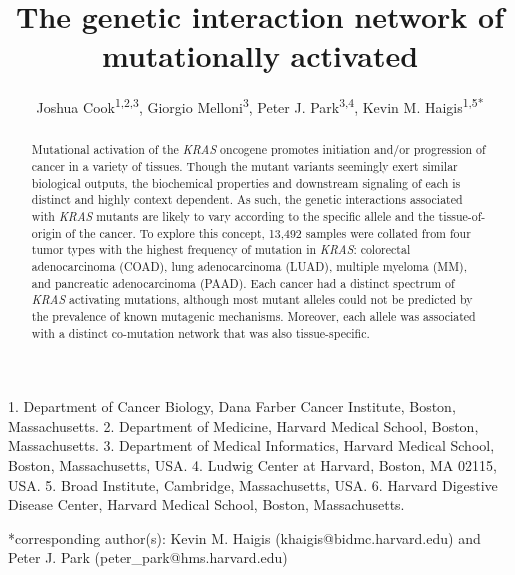 \documentclass[english, 12pt, letterpaper]{article}
\title{The genetic interaction network of mutationally activated \KRAS{}}
\author{
    Joshua Cook\textsuperscript{1,2,3},
    Giorgio Melloni\textsuperscript{3}, 
    Peter J. Park\textsuperscript{3,4}, 
    Kevin M. Haigis\textsuperscript{1,5{*}}
}
\newcommand{\KRAS}{\emph{KRAS}}
\begin{document}
\maketitle

\thispagestyle{fancy}

1. Department of Cancer Biology, Dana Farber Cancer Institute, Boston, Massachusetts.
2. Department of Medicine, Harvard Medical School, Boston, Massachusetts.
3. Department of Medical Informatics, Harvard Medical School, Boston, Massachusetts, USA.
4. Ludwig Center at Harvard, Boston, MA 02115, USA.
5. Broad Institute, Cambridge, Massachusetts, USA.
6. Harvard Digestive Disease Center, Harvard Medical School, Boston, Massachusetts.

{*}corresponding author(s):
Kevin M. Haigis (khaigis@bidmc.harvard.edu) and Peter J. Park (peter\_park@hms.harvard.edu)

\begin{abstract}
Mutational activation of the  \KRAS{} oncogene promotes initiation and/or progression of cancer in a variety of tissues.
Though the mutant variants seemingly exert similar biological outputs, the biochemical properties and downstream signaling  of each is distinct and highly context dependent.
As such, the genetic interactions associated with \KRAS{} mutants are likely to vary according to the specific allele and the tissue-of-origin of the cancer.
To explore this concept, 13,492 samples were collated from four tumor types with the highest frequency of mutation in \KRAS{}: colorectal adenocarcinoma (COAD), lung adenocarcinoma (LUAD), multiple myeloma (MM), and pancreatic adenocarcinoma (PAAD).
Each cancer had a distinct spectrum of \KRAS{} activating mutations, although most mutant alleles could not be predicted by the prevalence of known mutagenic mechanisms.
Moreover, each allele was associated with a distinct co-mutation network that was also tissue-specific.
 
\end{abstract}
\end{document}
